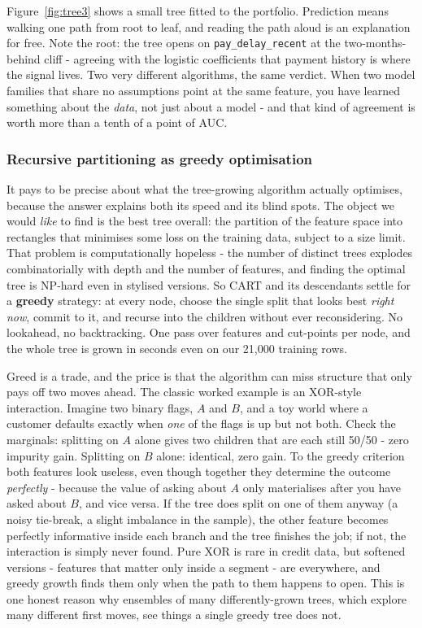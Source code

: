 \documentclass[11pt,a4paper]{article}
\begin{document}
Figure~\ref{fig:tree3} shows a small tree fitted to the portfolio.
Prediction means walking one path from root to leaf, and reading the path
aloud is an explanation for free. Note the root: the tree opens on
\texttt{pay\_delay\_recent} at the two-months-behind cliff - agreeing
with the logistic coefficients that payment history is where the signal
lives. Two very different algorithms, the same verdict. When two model
families that share no assumptions point at the same feature, you have
learned something about the \emph{data}, not just about a model - and
that kind of agreement is worth more than a tenth of a point of AUC.

\subsubsection{Recursive partitioning as greedy optimisation}
It pays to be precise about what the tree-growing algorithm actually
optimises, because the answer explains both its speed and its blind
spots. The object we would \emph{like} to find is the best tree overall:
the partition of the feature space into rectangles that minimises some
loss on the training data, subject to a size limit. That problem is
computationally hopeless - the number of distinct trees explodes
combinatorially with depth and the number of features, and finding the
optimal tree is NP-hard even in stylised versions. So CART and its
descendants settle for a \textbf{greedy} strategy: at every node, choose
the single split that looks best \emph{right now}, commit to it, and
recurse into the children without ever reconsidering. No lookahead, no
backtracking. One pass over features and cut-points per node, and the
whole tree is grown in seconds even on our 21{,}000 training rows.

Greed is a trade, and the price is that the algorithm can miss
structure that only pays off two moves ahead. The classic worked
example is an XOR-style interaction. Imagine two binary flags, $A$ and
$B$, and a toy world where a customer defaults exactly when \emph{one}
of the flags is up but not both. Check the marginals: splitting on $A$
alone gives two children that are each still 50/50 - zero impurity
gain. Splitting on $B$ alone: identical, zero gain. To the greedy
criterion both features look useless, even though together they
determine the outcome \emph{perfectly} - because the value of asking
about $A$ only materialises after you have asked about $B$, and vice
versa. If the tree does split on one of them anyway (a noisy
tie-break, a slight imbalance in the sample), the other feature
becomes perfectly informative inside each branch and the tree finishes
the job; if not, the interaction is simply never found. Pure XOR is
rare in credit data, but softened versions - features that matter
only inside a segment - are everywhere, and greedy growth finds them
only when the path to them happens to open. This is one honest reason
why ensembles of many differently-grown trees, which explore many
different first moves, see things a single greedy tree does not.
\end{document}
